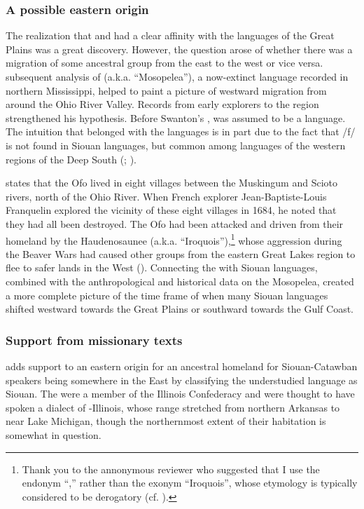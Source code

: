 \documentclass[output=paper]{LSP/langsci}
\begin{document}
\subsubsection{A possible eastern origin} The realization that  and  had a clear affinity with the  languages of the Great Plains was a great discovery. However, the question arose of whether there was a migration of some ancestral group from the east to the west or vice versa.  subsequent analysis of  (a.k.a. ``Mosopelea''), a now-extinct language recorded in northern Mississippi, helped to paint a picture of westward migration from around the Ohio River Valley. Records from early explorers to the region strengthened his hypothesis. Before Swanton's ,  was assumed to be a  language. The intuition that  belonged with the  languages is in part due to the fact that /f/ is not found in Siouan languages, but common among languages of the western regions of the Deep South (\citealt{Rankin2004ofo}; \citealt{Kaufman2014}). 

\citet{Hanna1911} states that the Ofo lived in eight villages between the Muskingum and Scioto rivers, north of the Ohio River. When French explorer Jean-Baptiste-Louis Franquelin explored the vicinity of these eight villages in 1684, he noted that they had all been destroyed. The Ofo had been attacked and driven from their homeland by the Haudenosaunee (a.k.a. ``Iroquois''),\footnote{Thank you to the annonymous reviewer who suggested that I use the endonym ``,'' rather than the exonym ``Iroquois'', whose etymology is typically considered to be derogatory (cf. \citealt{Day1968}).} whose aggression during the Beaver Wars had caused other groups from the eastern Great Lakes region to flee to safer lands in the West (\citealt{Swanton1952}). Connecting the  with Siouan languages, combined with the anthropological and historical data on the Mosopelea, created a more complete picture of the time frame of when many Siouan languages shifted westward towards the Great Plains or southward towards the Gulf Coast. 

\subsubsection{Support from missionary texts} \citet{Koontz1995a,Koontz1995b} adds support to an eastern origin for an ancestral homeland for Siouan-Catawban speakers being somewhere in the East by classifying the understudied  language  as Siouan. The  were a member of the Illinois Confederacy and were thought to have spoken a dialect of -Illinois, whose range stretched from northern Arkansas to near Lake Michigan, though the northernmost extent of their habitation is somewhat in question. 
\end{document}
